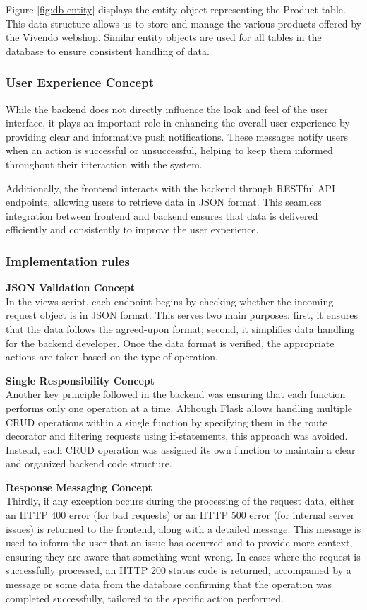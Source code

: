 Figure \ref{fig:db-entity} displays the entity object representing the Product table. This data structure allows us to store and manage the various products offered by the Vivendo webshop. Similar entity objects are used for all tables in the database to ensure consistent handling of data.

\subsubsection{User Experience Concept}
While the backend does not directly influence the look and feel of the user interface, it plays an important role in enhancing the overall user experience by providing clear and informative push notifications. These messages notify users when an action is successful or unsuccessful, helping to keep them informed throughout their interaction with the system.

Additionally, the frontend interacts with the backend through RESTful API endpoints, allowing users to retrieve data in JSON format. This seamless integration between frontend and backend ensures that data is delivered efficiently and consistently to improve the user experience.

\subsubsection{Implementation rules}
\textbf{JSON Validation Concept} \\
In the views script, each endpoint begins by checking whether the incoming request object is in JSON format. This serves two main purposes: first, it ensures that the data follows the agreed-upon format; second, it simplifies data handling for the backend developer. Once the data format is verified, the appropriate actions are taken based on the type of operation.

\textbf{Single Responsibility Concept} \\
Another key principle followed in the backend was ensuring that each function performs only one operation at a time. Although Flask allows handling multiple CRUD operations within a single function by specifying them in the route decorator and filtering requests using if-statements, this approach was avoided. Instead, each CRUD operation was assigned its own function to maintain a clear and organized backend code structure.

\textbf{Response Messaging Concept} \\
Thirdly, if any exception occurs during the processing of the request data, either an HTTP 400 error (for bad requests) or an HTTP 500 error (for internal server issues) is returned to the frontend, along with a detailed message. This message is used to inform the user that an issue has occurred and to provide more context, ensuring they are aware that something went wrong. In cases where the request is successfully processed, an HTTP 200 status code is returned, accompanied by a message or some data from the database confirming that the operation was completed successfully, tailored to the specific action performed.